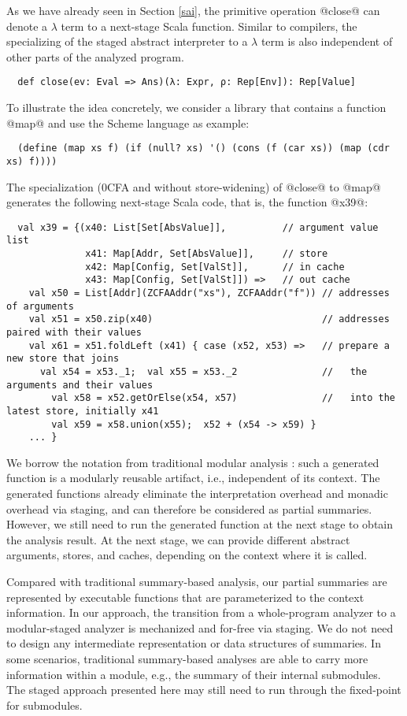 As we have already seen in Section \ref{sai}, the primitive operation @close@
can denote a $\lambda$ term to a next-stage Scala function. Similar to
compilers, the specializing of the staged abstract interpreter to a $\lambda$
term is also independent of other parts of the analyzed program.
\begin{lstlisting}
  def close(ev: Eval => Ans)(λ: Expr, ρ: Rep[Env]): Rep[Value]
\end{lstlisting}

To illustrate the idea concretely, we consider a library that contains a
function @map@ and use the Scheme language as example:
\begin{lstlisting}
  (define (map xs f) (if (null? xs) '() (cons (f (car xs)) (map (cdr xs) f))))
\end{lstlisting}

The specialization (0CFA and without store-widening) of @close@ to
@map@ generates the following next-stage Scala code, that is, the
function @x39@:
\begin{lstlisting}
  val x39 = {(x40: List[Set[AbsValue]],          // argument value list
              x41: Map[Addr, Set[AbsValue]],     // store
              x42: Map[Config, Set[ValSt]],      // in cache
              x43: Map[Config, Set[ValSt]]) =>   // out cache
    val x50 = List[Addr](ZCFAAddr("xs"), ZCFAAddr("f")) // addresses of arguments
    val x51 = x50.zip(x40)                              // addresses paired with their values
    val x61 = x51.foldLeft (x41) { case (x52, x53) =>   // prepare a new store that joins
      val x54 = x53._1;  val x55 = x53._2               //   the arguments and their values
        val x58 = x52.getOrElse(x54, x57)               //   into the latest store, initially x41
        val x59 = x58.union(x55);  x52 + (x54 -> x59) }
    ... }
\end{lstlisting}

We borrow the notation from traditional modular analysis
\cite{DBLP:conf/cc/CousotC02}: such a generated function is a modularly
reusable artifact, i.e., independent of its context.
The generated functions already eliminate the interpretation overhead and
monadic overhead via staging, and can therefore be considered as partial
summaries. However, we still need to run the generated function at the next
stage to obtain the analysis result.  At the next stage, we can provide
different abstract arguments, stores, and caches, depending on the context
where it is called.

Compared with traditional summary-based analysis, our partial
summaries are represented by executable functions that are
parameterized to the context information. In our approach, the
transition from a whole-program analyzer to a modular-staged analyzer is
mechanized and for-free via staging. We do not need to design any
intermediate representation or data structures of summaries.  In some
scenarios, traditional summary-based analyses are able to carry more
information within a module, e.g., the summary of their internal
submodules. The staged approach presented here may still need to run
through the fixed-point for submodules.

